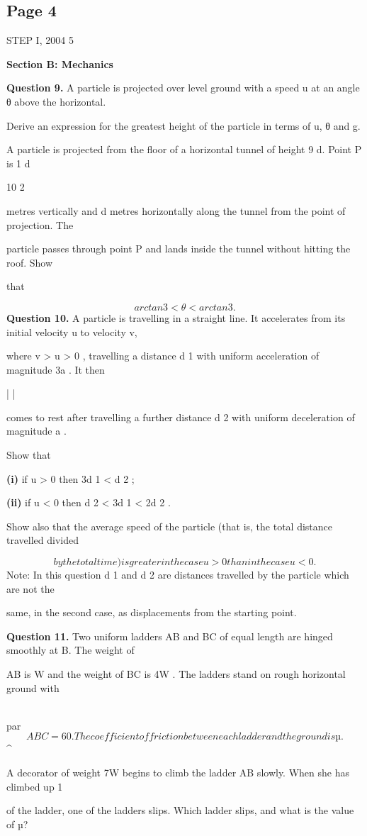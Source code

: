 \documentclass[12pt]{article}
\begin{document}
\subsection*{Page 4}
\begin{flushleft}
STEP I, 2004 5\par
\bigskip\textbf{Section B: Mechanics}\par
\bigskip\textbf{Question 9.} A particle is projected over level ground with a speed u at an angle θ above the horizontal.\par
Derive an expression for the greatest height of the particle in terms of u, θ and g.\par
A particle is projected from the floor of a horizontal tunnel of height 9 d. Point P is 1 d\par
10 2\par
metres vertically and d metres horizontally along the tunnel from the point of projection. The\par
particle passes through point P and lands inside the tunnel without hitting the roof. Show\par
that\par
\[arctan 3 < θ < arctan 3 .\]
\bigskip\textbf{Question 10.} A particle is travelling in a straight line. It accelerates from its initial velocity u to velocity v,\par
where v > u > 0 , travelling a distance d 1 with uniform acceleration of magnitude 3a . It then\par
| |\par
comes to rest after travelling a further distance d 2 with uniform deceleration of magnitude a .\par
Show that\par
\textbf{(i)} if u > 0 then 3d 1 < d 2 ;\par
\textbf{(ii)} if u < 0 then d 2 < 3d 1 < 2d 2 .\par
Show also that the average speed of the particle (that is, the total distance travelled divided\par
\[by the total time) is greater in the case u > 0 than in the case u < 0 .\]
Note: In this question d 1 and d 2 are distances travelled by the particle which are not the\par
same, in the second case, as displacements from the starting point.\par
\bigskip\textbf{Question 11.} Two uniform ladders AB and BC of equal length are hinged smoothly at B. The weight of\par
AB is W and the weight of BC is 4W . The ladders stand on rough horizontal ground with\par
\\par
\[ABC = 60 . The coefficient of friction between each ladder and the ground is µ.\]
\textasciicircum{}\circ\par
A decorator of weight 7W begins to climb the ladder AB slowly. When she has climbed up 1\par
of the ladder, one of the ladders slips. Which ladder slips, and what is the value of µ?\par
\end{flushleft}
\end{document}
